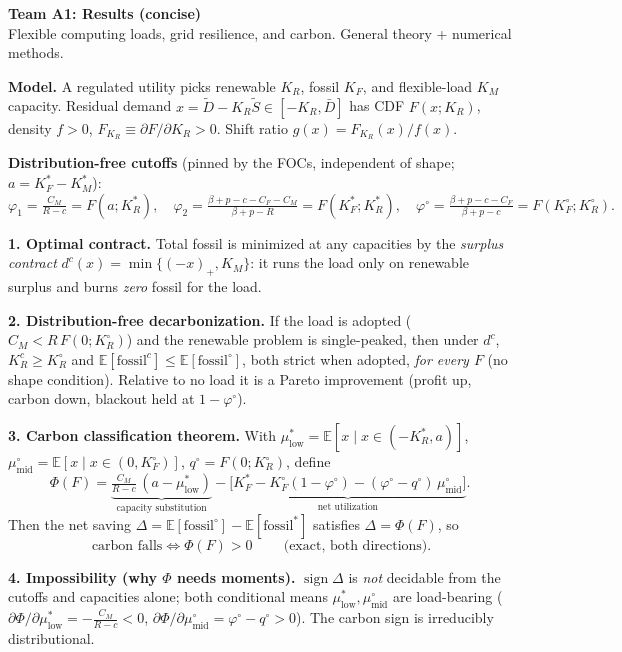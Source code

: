 \documentclass[11pt]{article}
\newcommand{\KR}{K_R}\newcommand{\KF}{K_F}\newcommand{\KM}{K_M}
\newcommand{\KRs}{K_R^{*}}\newcommand{\KFs}{K_F^{*}}\newcommand{\KMs}{K_M^{*}}
\newcommand{\KRo}{K_R^{\circ}}\newcommand{\KFo}{K_F^{\circ}}\newcommand{\KRc}{K_R^{c}}
\newcommand{\CM}{C_M}\newcommand{\CF}{C_F}\newcommand{\CR}{C_R}\newcommand{\Dbar}{\bar D}
\newcommand{\bp}{\beta+p}\newcommand{\E}{\mathbb{E}}\newcommand{\fs}{\mathrm{fossil}}
\newcommand{\phio}{\varphi^{\circ}}\newcommand{\qo}{q^{\circ}}\newcommand{\CMbar}{\bar C_M}
\newcommand{\mulow}{\mu^{*}_{\mathrm{low}}}\newcommand{\mumid}{\mu^{\circ}_{\mathrm{mid}}}
\begin{document}
{\large\textbf{Team A1: Results (concise)}}\\[2pt]
{\small Flexible computing loads, grid resilience, and carbon. General theory + numerical methods.}

\textbf{Model.} A regulated utility picks renewable $\KR$, fossil $\KF$, and flexible-load
$\KM$ capacity. Residual demand $x=\tilde D-\KR\tilde S\in[-\KR,\Dbar]$ has CDF $F(x;\KR)$,
density $f>0$, $F_{\KR}\equiv\partial F/\partial\KR>0$. Shift ratio $g(x)=F_{\KR}(x)/f(x)$.

\textbf{Distribution-free cutoffs} (pinned by the FOCs, independent of shape; $a=\KFs-\KMs$):
\[
  \varphi_1=\tfrac{\CM}{R-c}=F(a;\KRs),\quad
  \varphi_2=\tfrac{\bp-c-\CF-\CM}{\bp-R}=F(\KFs;\KRs),\quad
  \phio=\tfrac{\bp-c-\CF}{\bp-c}=F(\KFo;\KRo).
\]

\textbf{1. Optimal contract.} Total fossil is minimized at any capacities by the
\emph{surplus contract} $d^{c}(x)=\min\{(-x)_+,\KM\}$: it runs the load only on renewable
surplus and burns \emph{zero} fossil for the load.

\textbf{2. Distribution-free decarbonization.} If the load is adopted ($\CM<R\,F(0;\KRo)$)
and the renewable problem is single-peaked, then under $d^c$, $\KRc\ge\KRo$ and
$\E[\fs^{c}]\le\E[\fs^{\circ}]$, both strict when adopted, \emph{for every $F$} (no shape
condition). Relative to no load it is a Pareto improvement (profit up, carbon down, blackout
held at $1-\phio$).

\textbf{3. Carbon classification theorem.} With $\mulow=\E[x\mid x\in(-\KRs,a)]$,
$\mumid=\E[x\mid x\in(0,\KFo)]$, $\qo=F(0;\KRo)$, define
\[
  \Phi(F)=\underbrace{\tfrac{\CM}{R-c}\,(a-\mulow)}_{\text{capacity substitution}}
   -\underbrace{\big[\KFs-\KFo(1-\phio)-(\phio-\qo)\,\mumid\big]}_{\text{net utilization}}.
\]
Then the net saving $\Delta=\E[\fs^{\circ}]-\E[\fs^{*}]$ satisfies $\Delta=\Phi(F)$, so
\[
  \boxed{\ \text{carbon falls}\iff\Phi(F)>0\ }\qquad\text{(exact, both directions).}
\]

\textbf{4. Impossibility (why $\Phi$ needs moments).} $\operatorname{sign}\Delta$ is
\emph{not} decidable from the cutoffs and capacities alone; both conditional means
$\mulow,\mumid$ are load-bearing ($\partial\Phi/\partial\mulow=-\tfrac{\CM}{R-c}<0$,
$\partial\Phi/\partial\mumid=\phio-\qo>0$). The carbon sign is irreducibly distributional.
\end{document}
